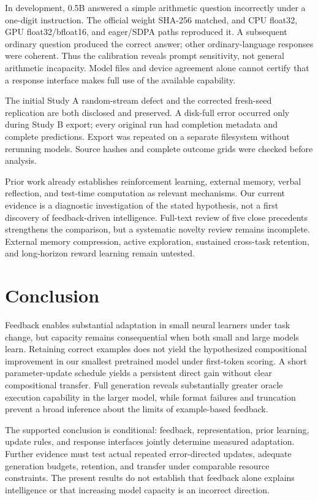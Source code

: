 \documentclass[11pt]{article}
\begin{document}
In development, 0.5B answered a simple arithmetic question incorrectly under
a one-digit instruction. The official weight SHA-256 matched, and CPU float32,
GPU float32/bfloat16, and eager/SDPA paths reproduced it. A subsequent ordinary
question produced the correct answer; other ordinary-language responses were
coherent. Thus the calibration reveals prompt sensitivity, not general
arithmetic incapacity. Model files and device agreement alone cannot certify
that a response interface makes full use of the available capability.

The initial Study A random-stream defect and the corrected fresh-seed
replication are both disclosed and preserved. A disk-full error occurred only
during Study B export; every original run had completion metadata and complete
predictions. Export was repeated on a separate filesystem without rerunning
models. Source hashes and complete outcome grids were checked before analysis.

Prior work already establishes reinforcement learning, external memory,
verbal reflection, and test-time computation as relevant mechanisms. Our
current evidence is a diagnostic investigation of the stated hypothesis, not
a first discovery of feedback-driven intelligence. Full-text review of five
close precedents strengthens the comparison, but a systematic novelty review
remains incomplete. External memory compression, active exploration, sustained
cross-task retention, and long-horizon reward learning remain untested.

\section{Conclusion}
Feedback enables substantial adaptation in small neural learners under task
change, but capacity remains consequential when both small and large models
learn. Retaining correct examples does not yield the hypothesized compositional
improvement in our smallest pretrained model under first-token scoring. A short
parameter-update schedule yields a persistent direct gain without clear
compositional transfer. Full generation reveals substantially greater oracle
execution capability in the larger model, while format failures and truncation
prevent a broad inference about the limits of example-based feedback.

The supported conclusion is conditional: feedback, representation, prior
learning, update rules, and response interfaces jointly determine measured
adaptation. Further evidence must test actual repeated error-directed updates,
adequate generation budgets, retention, and transfer under comparable resource
constraints. The present results do not establish that feedback alone explains
intelligence or that increasing model capacity is an incorrect direction.
\end{document}
